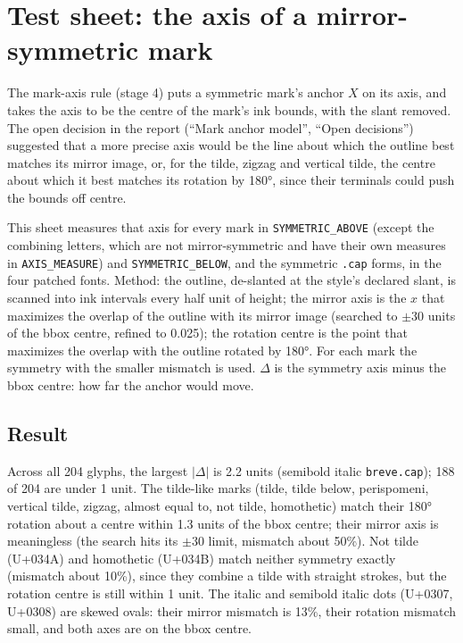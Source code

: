 \documentclass[10pt]{article}
\begin{document}
\section*{Test sheet: the axis of a mirror-symmetric mark}
The mark-axis rule (stage 4) puts a symmetric mark's anchor $X$ on its axis, and takes the axis to be the centre of the mark's ink bounds, with the slant removed.
The open decision in the report (``Mark anchor model'', ``Open decisions'') suggested that a more precise axis would be the line about which the outline best matches its mirror image,
or, for the tilde, zigzag and vertical tilde, the centre about which it best matches its rotation by 180°, since their terminals could push the bounds off centre.

This sheet measures that axis for every mark in \verb|SYMMETRIC_ABOVE| (except the combining letters, which are not mirror-symmetric and have their own measures in \verb|AXIS_MEASURE|) and \verb|SYMMETRIC_BELOW|,
and the symmetric \verb|.cap| forms, in the four patched fonts.
Method: the outline, de-slanted at the style's declared slant, is scanned into ink intervals every half unit of height;
the mirror axis is the $x$ that maximizes the overlap of the outline with its mirror image (searched to $\pm30$ units of the bbox centre, refined to 0.025);
the rotation centre is the point that maximizes the overlap with the outline rotated by 180°. For each mark the symmetry with the smaller mismatch is used.
$\Delta$ is the symmetry axis minus the bbox centre: how far the anchor would move.

\subsection*{Result}
Across all 204 glyphs, the largest $|\Delta|$ is 2.2 units (semibold italic \verb|breve.cap|); 188 of 204 are under 1 unit.
The tilde-like marks (tilde, tilde below, perispomeni, vertical tilde, zigzag, almost equal to, not tilde, homothetic) match their 180° rotation about a centre within 1.3 units of the bbox centre;
their mirror axis is meaningless (the search hits its $\pm30$ limit, mismatch about 50\%).
Not tilde (U+034A) and homothetic (U+034B) match neither symmetry exactly (mismatch about 10\%), since they combine a tilde with straight strokes, but the rotation centre is still within 1 unit.
The italic and semibold italic dots (U+0307, U+0308) are skewed ovals: their mirror mismatch is 13\%, their rotation mismatch small, and both axes are on the bbox centre.
\end{document}
